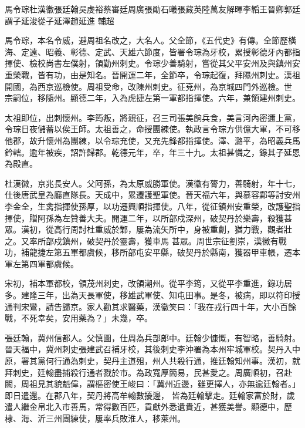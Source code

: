 
\begin{pinyinscope}

 馬令琮杜漢徽張廷翰吳虔裕蔡審廷周廣張勛石曦張藏英陸萬友解暉李韜王晉卿郭廷謂子延浚從子延澤趙延進
 輔超



 馬令琮，本名令威，避周祖名改之，大名人。父全節，《五代史》有傳。全節歷橫海、定遠、昭義、彰德、定武、天雄六節度，皆署令琮為牙校，累授彰德牙內都指揮使、檢校尚書左僕射，領勤州刺史。令琮少善騎射，嘗從其父平安州及與鎮州安重榮戰，皆有功，由是知名。晉開運二年，全節卒，令琮起復，拜隰州刺史。漢祖開國，為西京巡檢使。周祖受命，改陳州刺史。征兗州，為京城四門外巡檢。世
 宗嗣位，移隨州。顯德二年，入為虎捷左第一軍都指揮使。六年，兼領建州刺史。



 太祖即位，出刺懷州。李筠叛，將親征，召三司張美餉兵食，美言河內密邇上黨，令琮日夜儲蓄以俟王師。太祖善之，命授團練使。執政言令琮方供億大軍，不可移他郡，故升懷州為團練，以令琮充使，又充先鋒都指揮使。澤、潞平，為昭義兵馬鈐轄。逾年被疾，詔許歸郡。乾德元年，卒，年三十九。太祖甚憐之，錄其子延恩為殿直。



 杜漢徽，京兆長安人。父阿孫，為太原威勝軍使。漢徽有膂力，善騎射，年十七，仕後唐武皇為廳直隊長。天成中，累遷護聖軍使。晉天福六年，與慕容鄴等討安州李金全，生禽指揮使孫厚，以功遷興順指揮使。八年，從征鎮州安重榮，改護聖指揮使，贈阿孫為左贊善大夫。開運二年，以所部戍深州，破契丹於樂壽，殺獲甚眾。漢初，從高行周討杜重威於鄴，屢為流矢所中，身被重創，猶力戰，觀者壯之。又率所部戍鎮州，破契丹於靈壽，獲車馬
 甚眾。周世宗征劉崇，漢徽有戰功，補龍捷左第五軍都虞候，移所部屯安平縣，破契丹於縣南，獲器甲車帳，遷本軍左第四軍都虞候。



 宋初，補本軍都校，領茂州刺史，改領潮州。從平李筠，又從平李重進，錄功居多。建隆三年，出為天長軍使，移雄武軍使、知屯田事。是冬，被病，即以符印授通判宋鸞，請告歸京。家人勸其求醫藥，漢徽笑曰：「我在戎行四十年，大小百餘戰，不死幸矣，安用藥為？」未幾，卒。



 張廷翰，冀州信都人。父慎圖，仕周為兵部郎中。廷翰少慷慨，有智略，善騎射。晉天福中，冀州刺史張建武召補牙校，其後刺史李沖署為本州牢城軍校。契丹入中原，署其黨何行通為刺史，契丹主道殂，州人共殺行通，推廷翰知州事。漢初，就拜刺史，廷翰盡捕殺行通者戮於市。為政寬厚簡易，民甚愛之。周廣順初，召赴闕，周祖見其貌魁偉，謂樞密使王峻曰：「冀州近邊，雖更擇人，亦無逾廷翰者。」即日遣還。在郡八年，契丹將高牟翰數擾邊，
 皆為廷翰擊走。廷翰家富於財，歲遣人繼金帛北入市善馬，常得數百匹，貢獻外悉遺貴近，甚獲美譽。顯德中，歷棣、海、沂三州團練使，屢率兵敗淮人，移萊州。




\end{pinyinscope}
